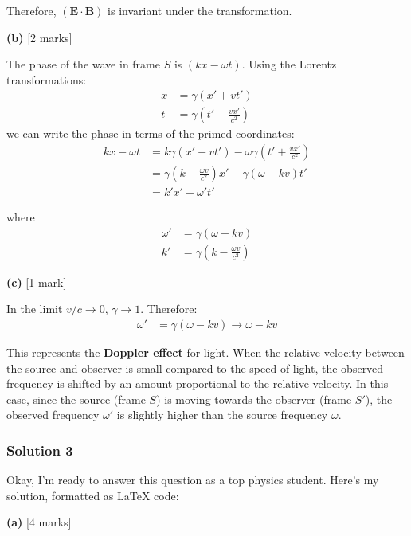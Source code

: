 \documentclass{article}
\begin{document}
Therefore, $(\mathbf{E} \cdot \mathbf{B})$ is invariant under the transformation.

\textbf{(b)} [2 marks]

The phase of the wave in frame $S$ is $(kx - \omega t)$.  Using the Lorentz transformations:
\begin{align*}
x &= \gamma (x' + vt') \\
t &= \gamma \left( t' + \frac{vx'}{c^2} \right)
\end{align*}
we can write the phase in terms of the primed coordinates:
\begin{align*}
kx - \omega t &= k \gamma (x' + vt') - \omega \gamma \left( t' + \frac{vx'}{c^2} \right) \\
&= \gamma \left( k - \frac{\omega v}{c^2} \right) x' - \gamma (\omega - kv) t' \\
&= k'x' - \omega' t'
\end{align*}

where 
\begin{align*}
\omega' &= \gamma (\omega - k v) \\
k' &= \gamma \left( k - \frac{\omega v}{c^2} \right)
\end{align*}

\textbf{(c)} [1 mark]

In the limit $v/c \to 0$, $\gamma \to 1$. Therefore:
\begin{align*}
\omega' &= \gamma (\omega - kv) \to \omega - kv
\end{align*}

This represents the \textbf{Doppler effect} for light. When the relative velocity between the source and observer is small compared to the speed of light, the observed frequency is shifted by an amount proportional to the relative velocity. In this case, since the source (frame $S$) is moving towards the observer (frame $S'$), the observed frequency $\omega'$ is slightly higher than the source frequency $\omega$.


\subsubsection{Solution 3}
Okay, I'm ready to answer this question as a top physics student. Here's my solution, formatted as LaTeX code:

\textbf{(a)} [4 marks]
\end{document}
